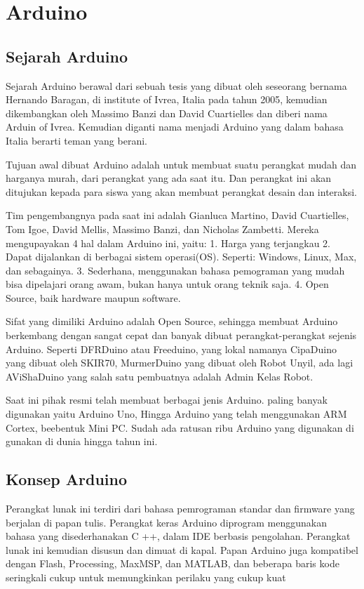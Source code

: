 \section{Arduino}
\subsection{Sejarah Arduino}
	Sejarah Arduino berawal dari sebuah tesis yang dibuat oleh seseorang bernama Hernando Baragan, di institute of Ivrea, Italia pada tahun 2005, kemudian dikembangkan oleh Massimo Banzi dan David Cuartielles dan diberi nama Arduin of Ivrea. Kemudian diganti nama menjadi Arduino yang dalam bahasa Italia berarti teman yang berani.

	Tujuan awal dibuat Arduino adalah untuk membuat suatu perangkat mudah dan harganya murah, dari perangkat yang ada saat itu. Dan perangkat ini akan ditujukan kepada para siswa yang akan membuat perangkat desain dan interaksi.

	Tim pengembangnya pada saat ini adalah Gianluca Martino, David Cuartielles, Tom Igoe, David Mellis, Massimo Banzi, dan Nicholas Zambetti. Mereka mengupayakan 4 hal dalam Arduino ini, yaitu:
	1.	Harga yang terjangkau
	2.	Dapat dijalankan di berbagai sistem operasi(OS). Seperti: Windows, Linux, Max, dan sebagainya.
	3.	Sederhana, menggunakan bahasa pemograman yang mudah bisa dipelajari orang awam, bukan hanya untuk orang teknik saja.
	4.	Open Source, baik hardware maupun software.

	Sifat yang dimiliki Arduino adalah Open Source, sehingga membuat Arduino berkembang dengan sangat cepat dan banyak dibuat perangkat-perangkat sejenis Arduino. Seperti DFRDuino atau Freeduino,  yang lokal namanya CipaDuino yang dibuat oleh SKIR70, MurmerDuino yang dibuat oleh Robot Unyil, ada lagi AViShaDuino yang salah satu pembuatnya adalah Admin Kelas Robot.
	
	Saat ini pihak resmi telah membuat berbagai jenis Arduino.  paling banyak digunakan yaitu Arduino Uno, Hingga Arduino yang telah menggunakan ARM Cortex, beebentuk Mini PC. Sudah ada ratusan ribu Arduino yang digunakan di gunakan di dunia hingga tahun ini. 

\subsection{Konsep Arduino}
	Perangkat lunak ini terdiri dari bahasa pemrograman standar dan firmware yang berjalan di papan tulis. Perangkat keras Arduino diprogram menggunakan bahasa yang disederhanakan C ++, dalam IDE berbasis pengolahan. Perangkat lunak ini kemudian disusun dan dimuat di kapal. Papan Arduino juga kompatibel dengan Flash, Processing, MaxMSP, dan MATLAB, dan beberapa baris kode seringkali cukup untuk memungkinkan perilaku yang cukup kuat